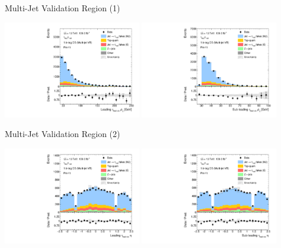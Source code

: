 \documentclass[11pt, xcolor={dvipsnames}, aspectratio=169, notes]{beamer}
\begin{document}
\begin{frame}{Multi-Jet Validation Region (1)}
  \centering

  \includegraphics[width=0.45\textwidth]{fakefactors/fake_os_vr/Tau0Pt_fakevr}%
  \hfill%
  \includegraphics[width=0.45\textwidth]{fakefactors/fake_os_vr/Tau1Pt_fakevr}
\end{frame}


\begin{frame}{Multi-Jet Validation Region (2)}
  \centering

  \includegraphics[width=0.45\textwidth]{fakefactors/fake_os_vr/Tau0Eta_fakevr}%
  \hfill%
  \includegraphics[width=0.45\textwidth]{fakefactors/fake_os_vr/Tau1Eta_fakevr}
\end{frame}
\end{document}
